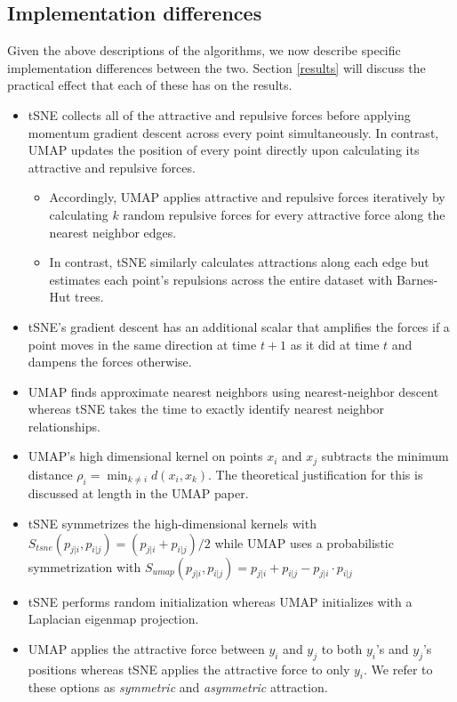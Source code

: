 \documentclass{article}
\theoremstyle{definition}
\begin{document}
\subsection{Implementation differences} \label{implementation_diffs}
Given the above descriptions of the algorithms, we now describe specific implementation differences between the two. Section \ref{results} will discuss the
practical effect that each of these has on the results.

\begin{itemize}
    \item tSNE collects all of the attractive and repulsive forces before applying momentum gradient descent across every point simultaneously. In contrast,
        UMAP updates the position of every point directly upon calculating its attractive and repulsive forces.
    \begin{itemize}
        \item Accordingly, UMAP applies attractive and repulsive forces iteratively by calculating $k$ random repulsive forces for every attractive force along the
            nearest neighbor edges.
        \item In contrast, tSNE similarly calculates attractions along each edge but estimates each point's repulsions across the entire dataset with Barnes-Hut
            trees.
    \end{itemize}

    \item tSNE's gradient descent has an additional scalar that amplifies the forces if a point moves in the same direction at time $t+1$ as it did at time $t$
        and dampens the forces otherwise.

    \item UMAP finds approximate nearest neighbors using nearest-neighbor descent whereas tSNE takes the time to exactly identify nearest neighbor relationships.

    \item UMAP's high dimensional kernel on points $x_i$ and $x_j$ subtracts the minimum distance $\rho_i = \min_{k \neq i} d(x_i, x_k)$. The theoretical
        justification for this is discussed at length in the UMAP paper. 

    \item tSNE symmetrizes the high-dimensional kernels with $S_{tsne}(p_{j|i}, p_{i|j}) = (p_{j|i} + p_{i|j}) / 2$ while UMAP uses a probabilistic
        symmetrization with $S_{umap}(p_{j|i}, p_{i|j}) = p_{j|i} + p_{i|j} - p_{j|i} \cdot p_{i|j}$

    \item tSNE performs random initialization whereas UMAP initializes with a Laplacian eigenmap projection.

    \item UMAP applies the attractive force between $y_i$ and $y_j$ to both $y_i$'s and $y_j$'s positions whereas tSNE applies the attractive force to only $y_i$.
        We refer to these options as \textit{symmetric} and \textit{asymmetric} attraction.
\end{itemize}
\end{document}
